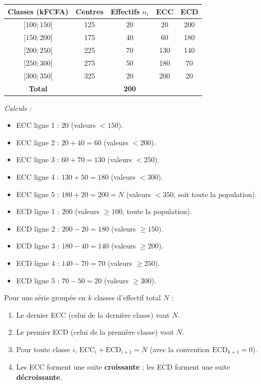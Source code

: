 \documentclass[11pt]{article}
\begin{document}
\begin{exemplebox}
\begin{center}
\begin{tabular}{|c|c|c|c|c|}\hline
\textbf{Classes (kFCFA)} & \textbf{Centres} & \textbf{Effectifs $n_i$} & \textbf{ECC} & \textbf{ECD} \\ \hline
$[100 ; 150[$ & 125 & 20 & 20 & 200 \\ \hline
$[150 ; 200[$ & 175 & 40 & 60 & 180 \\ \hline
$[200 ; 250[$ & 225 & 70 & 130 & 140 \\ \hline
$[250 ; 300[$ & 275 & 50 & 180 & 70 \\ \hline
$[300 ; 350[$ & 325 & 20 & 200 & 20 \\ \hline
\textbf{Total} & & \textbf{200} & & \\ \hline
\end{tabular}
\end{center}
\emph{Calculs :}
\begin{itemize}
\item ECC ligne 1 : $20$ (valeurs $< 150$).
\item ECC ligne 2 : $20+40=60$ (valeurs $< 200$).
\item ECC ligne 3 : $60+70=130$ (valeurs $< 250$).
\item ECC ligne 4 : $130+50=180$ (valeurs $< 300$).
\item ECC ligne 5 : $180+20=200=N$ (valeurs $< 350$, soit toute la population).
\item ECD ligne 1 : $200$ (valeurs $\ge 100$, toute la population).
\item ECD ligne 2 : $200-20=180$ (valeurs $\ge 150$).
\item ECD ligne 3 : $180-40=140$ (valeurs $\ge 200$).
\item ECD ligne 4 : $140-70=70$ (valeurs $\ge 250$).
\item ECD ligne 5 : $70-50=20$ (valeurs $\ge 300$).
\end{itemize}
\end{exemplebox}

\begin{propriete}
Pour une série groupée en $k$ classes d'effectif total $N$ :
\begin{enumerate}
\item Le dernier ECC (celui de la dernière classe) vaut \textbf{$N$}.
\item Le premier ECD (celui de la première classe) vaut \textbf{$N$}.
\item Pour toute classe $i$, $\text{ECC}_i + \text{ECD}_{i+1} = N$ (avec la convention $\text{ECD}_{k+1}=0$).
\item Les ECC forment une suite \textbf{croissante} ; les ECD forment une suite \textbf{décroissante}.
\end{enumerate}
\end{propriete}
\end{document}
